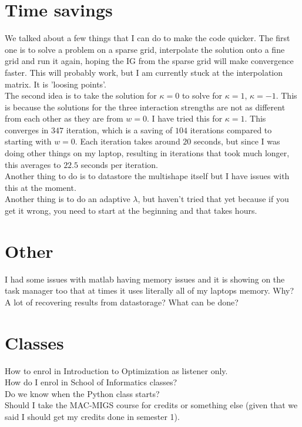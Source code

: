 \documentclass[11pt, a4paper]{article}
\theoremstyle{definition}
\begin{document}
    \section{Time savings}
    We talked about a few things that I can do to make the code quicker.
    The first one is to solve a problem on a sparse grid, interpolate the solution onto a fine grid and run it again, hoping the IG from the sparse grid will make convergence faster.
    This will probably work, but I am currently stuck at the interpolation matrix. It is 'loosing points'.
    \\
    The second idea is to take the solution for $\kappa = 0$ to solve for $\kappa = 1$, $\kappa = -1$. This is because the solutions for the three interaction strengths are not as different from each other as they are from $w = 0$. 
    I have tried this for $\kappa = 1$. This converges in $347$ iteration, which is a saving of $104$ iterations compared to starting with $w = 0$. Each iteration takes around $20$ seconds, but since I was doing other things on my laptop, resulting in iterations that took much longer, this averages to $22.5$ seconds per iteration.\\
    Another thing to do is to datastore the multishape itself but I have issues with this at the moment.\\
    Another thing is to do an adaptive $\lambda$, but haven't tried that yet because if you get it wrong, you need to start at the beginning and that takes hours.
       
    \section{Other}
    I had some issues with matlab having memory issues and it is showing on the task manager too that at times it uses literally all of my laptops memory. Why? A lot of recovering results from datastorage? What can be done?
    
    \section{Classes}
    How to enrol in Introduction to Optimization as listener only.\\
    How do I enrol in School of Informatics classes?\\
    Do we know when the Python class starts?\\
    Should I take the MAC-MIGS course for credits or something else (given that we said I should get my credits done in semester 1).
       
    
\end{document}
